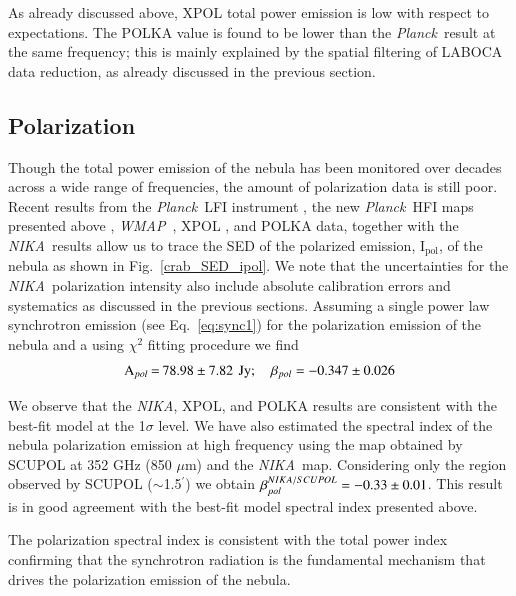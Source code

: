 \documentclass[twocolumn,traditabstract]{aa}
\def\NIKA{\textit{NIKA}}
\def\Planck{\textit{Planck}}
\def\WMAP{\textit{WMAP}}
\begin{document}
As already discussed above, XPOL total power emission is low with respect to expectations.
The POLKA value is found to be  lower than the \Planck\ result at the same frequency; this is mainly explained by the spatial filtering of LABOCA data reduction, as already discussed in the previous section.
  


\subsection{Polarization}
Though the total power emission of the  nebula has been monitored over decades across a wide range of frequencies, the amount of polarization data is still poor.
Recent results from the \Planck\ LFI instrument \citep{2015arXiv150702058P}, the new \Planck\ HFI maps presented above \citep{planck2018}, \WMAP\ \citep{2011ApJS..192...19W},
XPOL \citep{aumont2010}, and POLKA \citep{2014PASP..126.1027W} data, together with the \NIKA\ results allow us to trace the SED of the polarized emission, I$_{\textrm{pol}}$, of the  nebula as shown in Fig.~\ref{crab_SED_ipol}.  
We note that the uncertainties for the \NIKA\ polarization intensity also include  absolute calibration errors
and systematics as discussed in the previous sections.  
Assuming a single power law synchrotron emission (see Eq.~\ref{eq:sync1}) for the polarization emission of the  nebula and a using $\chi^2$ fitting procedure we find
$$
\setlength\arraycolsep{0.1em}
 \begin{array}{rclcl}
  \textrm{A$_{pol}$}&=& 78.98\pm7.82 & & \textrm{Jy}; \quad \textrm{$\beta_{pol}$} = - 0.347\pm0.026\\
 \end{array}
 $$
 
We observe that the \NIKA, XPOL, and POLKA results are consistent with the best-fit model at the 1$\sigma$ level.
We have also estimated the spectral index of the  nebula polarization emission at high frequency using the map obtained by SCUPOL \citep{scubapol} at 352 GHz (850
$\mu$m) and the \NIKA\ map. Considering only the region observed by SCUPOL ($\sim$1.5$^{\prime}$) we
obtain $\beta_{pol}^{\small NIKA/SCUPOL} = -0.33 \pm 0.01$.
This result is in good agreement with the best-fit model spectral index presented above.

The polarization spectral index is consistent with the total power index confirming that the synchrotron radiation is the fundamental mechanism that drives the polarization emission of the  nebula.
\end{document}
